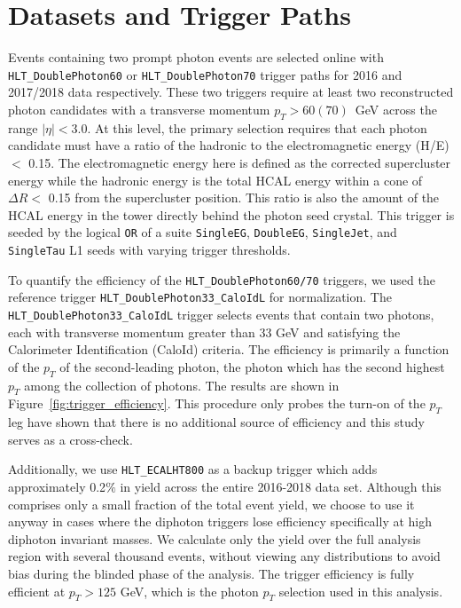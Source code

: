 \chapter{Datasets and Trigger Paths}\label{ch:appendix_datasets_triggerpaths}
Events containing two prompt photon events are selected online with \texttt{HLT\_DoublePhoton60} or \texttt{HLT\_DoublePhoton70} trigger paths for 2016 and 2017/2018 data respectively. These two triggers require at least two reconstructed photon candidates with a transverse momentum $p_{T} > 60 (70)$~GeV across the range $|\eta| < 3.0$. At this level, the primary selection requires that each photon candidate must have a ratio of the hadronic to the electromagnetic energy (H/E) $<$ 0.15. The electromagnetic energy here is defined as the corrected supercluster energy while the hadronic energy is the total HCAL energy within a cone of $\Delta R <$  0.15 from the supercluster position. This ratio is also the amount of the HCAL energy in the tower directly behind the photon seed crystal. This trigger is seeded by the logical \texttt{OR} of a suite \texttt{SingleEG}, \texttt{DoubleEG}, \texttt{SingleJet}, and \texttt{SingleTau} L1 seeds with varying trigger thresholds. 

To quantify the efficiency of the \texttt{HLT\_DoublePhoton60/70} triggers, we used the reference trigger \texttt{HLT\_DoublePhoton33\_CaloIdL} for normalization. The \texttt{HLT\_DoublePhoton33\_CaloIdL} trigger selects events that contain two photons, each with transverse momentum greater than 33 GeV and satisfying the Calorimeter Identification (CaloId) criteria. The efficiency is primarily a function of the $p_{T}$ of the second-leading photon, the photon which has the second highest $p_{T}$ among the collection of photons. The results are shown in Figure~\ref{fig:trigger_efficiency}. This procedure only probes the turn-on of the $p_{T}$ leg \cite{ref:AN2016_167} have shown that there is no additional source of efficiency and this study serves as a cross-check. 

Additionally, we use \texttt{HLT\_ECALHT800} as a backup trigger which adds approximately 0.2$\%$ in yield across the entire 2016-2018 data set. Although this comprises only a small fraction of the total event yield, we choose to use it anyway in cases where the diphoton triggers lose efficiency specifically at high diphoton invariant masses. We calculate only the yield over the full analysis region with several thousand events, without viewing any distributions to avoid bias during the blinded phase of the analysis. The trigger efficiency is fully efficient at $p_T > 125$ GeV, which is the photon $p_{T}$ selection used in this analysis. 

